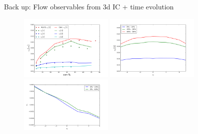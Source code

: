 \documentclass[11pt]{beamer}
\begin{document}
\begin{frame}[noframenumbering]{Back up: Flow observables from 3d IC + time evolution}
\begin{figure}
\begin{center}
\includegraphics[width = 0.4\textwidth]{./pics/new-PbPb-vnm-p1.png}
\includegraphics[width = 0.4\textwidth]{./pics/new-PbPb-vnm-eta-p1.png}\\
\includegraphics[width = 0.4\textwidth]{./pics/RUN-1-PbPb-v1-eta.png}
\end{center}
\end{figure}
\end{frame}
\end{document}

